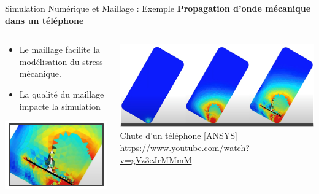 \begin{frame}{Simulation Numérique et Maillage : Exemple}
    \textbf{Propagation d'onde mécanique dans un téléphone}
    
    \begin{columns}
        \begin{column}{0.4\textwidth}
            \begin{itemize}
                \item Le maillage facilite la modélisation du stress mécanique.
                \item La qualité du maillage impacte la simulation 
            \end{itemize}
            \begin{center}
                \includegraphics[width=.9\linewidth]{img/new_images/convergence_depend_simu.PNG}
            \end{center}
        \end{column}
        \begin{column}{0.6\textwidth}
            \includegraphics[width=\linewidth]{img/new_images/phone_drop.png}
            \centering
            Chute d'un téléphone [ANSYS]\\
            \scriptsize{\url{https://www.youtube.com/watch?v=gVz3eJrMMmM}}
        \end{column}
    \end{columns}
\end{frame}

